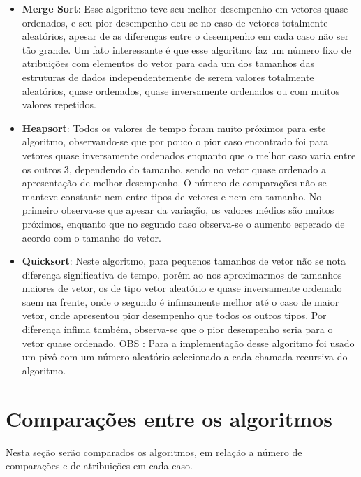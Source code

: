 \documentclass{article}
\begin{document}
\begin{itemize}
    \item \textbf{Merge Sort}: Esse algoritmo teve seu melhor desempenho em vetores quase ordenados, e seu pior desempenho deu-se no caso de vetores totalmente aleatórios, apesar de as diferenças entre o desempenho em cada caso não ser tão grande. Um fato interessante é que esse algoritmo faz um número fixo de atribuições com elementos do vetor para cada um dos tamanhos das estruturas de dados independentemente de serem valores totalmente aleatórios, quase ordenados, quase inversamente ordenados ou com muitos valores repetidos.
    \item \textbf{Heapsort}: Todos os valores de tempo foram muito próximos para este algoritmo, observando-se que por pouco o pior caso encontrado foi para vetores quase inversamente ordenados enquanto que o melhor caso varia entre os outros 3, dependendo do tamanho, sendo no vetor quase ordenado a apresentação de melhor desempenho. O número de comparações não se manteve constante nem entre tipos de vetores e nem em tamanho. No primeiro observa-se que apesar da variação, os valores médios são muitos próximos, enquanto que no segundo caso observa-se o aumento esperado de acordo com o tamanho do vetor.
    \item \textbf{Quicksort}: Neste algoritmo, para pequenos tamanhos de vetor não se nota diferença significativa de tempo, porém ao nos aproximarmos de tamanhos maiores de vetor, os de tipo vetor aleatório e quase inversamente ordenado saem na frente, onde o segundo é infimamente melhor até o caso de maior vetor, onde apresentou pior desempenho que todos os outros tipos. Por diferença ínfima também, observa-se que o pior desempenho seria para o vetor quase ordenado.
    OBS : Para a implementação desse algoritmo foi usado um pivô com um número aleatório selecionado a cada chamada recursiva do algoritmo.
\end{itemize}
\section{Comparações entre os algoritmos}
Nesta seção serão comparados os algoritmos, em relação a número de comparações e de atribuições em cada caso.
\end{document}
